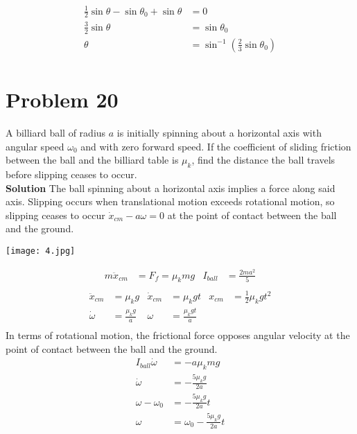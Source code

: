 \documentclass[]{article}
\newcommand{\bd}{\textbf}
\begin{document}
	\begin{equation}
		\begin{split}
			\frac{1}{2} \sin \theta - \sin \theta_0 + \sin \theta &= 0 \\
			\frac{3}{2} \sin \theta &= \sin \theta_0 \\
			\theta &= \sin^{-1}\left( \frac{2}{3} \sin \theta_0 \right) \\
		\end{split}
	\end{equation}
	
	\section{Problem 20}
	
	A billiard ball of radius $a$ is initially spinning about a horizontal axis with angular speed $\omega_0$ and with zero forward speed. If the coefficient of sliding friction between the ball and the billiard table is $\mu_k$, find the distance the ball travels before slipping ceases to occur. \\
	
	\bd{Solution} The ball spinning about a horizontal axis implies a force along said axis. Slipping occurs when translational motion exceeds rotational motion, so slipping ceases to occur $\dot{x}_{cm} - a\omega = 0$ at the point of contact between the ball and the ground.
	
	\begin{center}
		\texttt{[image: 4.jpg]}
	\end{center}
	\begin{equation}
		\begin{aligned}
			m\ddot{x}_{cm} &= F_f = \mu_k m g & I_{ball} &= \frac{2ma^2}{5} \\
		\end{aligned}
	\end{equation}
	\begin{equation}
		\begin{aligned}
			\ddot{x}_{cm} &= \mu_k g & \dot{x}_{cm} &= \mu_k g t & x_{cm} &= \frac{1}{2} \mu_k g t^2 \\
			\dot{\omega} &= \frac{\mu_k g}{a} & \omega &= \frac{\mu_k gt}{a} \\
		\end{aligned}
	\end{equation}
	In terms of rotational motion, the frictional force opposes angular velocity at the point of contact between the ball and the ground.
	\begin{equation}
		\begin{split}
			I_{ball} \dot{\omega} &= -a \mu_k mg \\
			\dot{\omega} &= -\frac{5 \mu_k g}{2a} \\
			\omega - \omega_0 &= -\frac{5 \mu_k g}{2a} t \\
			\omega &= \omega_0 - \frac{5 \mu_k g}{2a} t \\
		\end{split}
	\end{equation}
\end{document}
